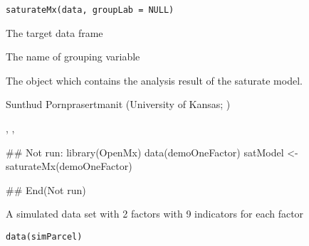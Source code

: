 \documentclass[a4paper]{book}
\begin{document}
%
\begin{Usage}
\begin{verbatim}
saturateMx(data, groupLab = NULL)
\end{verbatim}
\end{Usage}
%
\begin{Arguments}
\begin{ldescription}
\item[\code{data}] 
The target data frame

\item[\code{groupLab}] 
The name of grouping variable

\end{ldescription}
\end{Arguments}
%
\begin{Value}
The  object which contains the analysis result of the saturate model.
\end{Value}
%
\begin{Author}\relax
Sunthud Pornprasertmanit (University of Kansas; )
\end{Author}
%
\begin{SeeAlso}\relax
{}, , 
\end{SeeAlso}
%
\begin{Examples}
\begin{ExampleCode}
## Not run: 
library(OpenMx)
data(demoOneFactor)
satModel <- saturateMx(demoOneFactor)

## End(Not run)
\end{ExampleCode}
\end{Examples}
%
\begin{Description}\relax
A simulated data set with 2 factors with 9 indicators for each factor
\end{Description}
%
\begin{Usage}
\begin{verbatim}
data(simParcel)
\end{verbatim}
\end{Usage}
%
\end{document}
